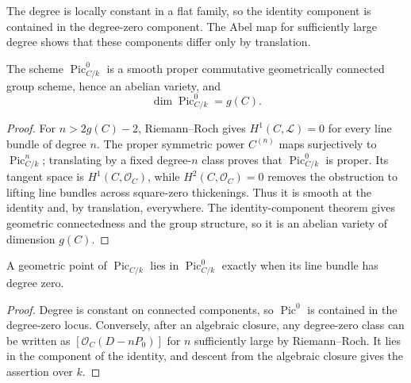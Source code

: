 The degree is locally constant in a flat family, so the identity component is
contained in the degree-zero component.  The Abel map for sufficiently large
degree shows that these components differ only by translation.

\begin{theorem}
  \label{pa-thm-pic0-abelian}
  \cite[Thm.~5.4 and Cors.~5.13--5.14]{kleiman-picard}
  The scheme \(\operatorname{Pic}^0_{C/k}\) is a smooth proper commutative
  geometrically connected group scheme, hence an abelian variety, and
  \[
    \dim\operatorname{Pic}^0_{C/k}=g(C).
  \]
\end{theorem}

\begin{proof}
  For \(n>2g(C)-2\), Riemann--Roch gives \(H^1(C,\mathcal L)=0\) for every
  line bundle of degree \(n\).  The proper symmetric power \(C^{(n)}\) maps
  surjectively to \(\operatorname{Pic}^n_{C/k}\); translating by a fixed
  degree-\(n\) class proves that \(\operatorname{Pic}^0_{C/k}\) is proper.
  Its tangent space is \(H^1(C,\mathcal O_C)\), while
  \(H^2(C,\mathcal O_C)=0\) removes the obstruction to lifting line bundles
  across square-zero thickenings.  Thus it is smooth at the identity and,
  by translation, everywhere.  The identity-component theorem gives
  geometric connectedness and the group structure, so it is an abelian
  variety of dimension \(g(C)\).
\end{proof}

\begin{proposition}
  \label{pa-prop-pic0-degree}
  \cite{kleiman-picard}
  A geometric point of \(\operatorname{Pic}_{C/k}\) lies in
  \(\operatorname{Pic}^0_{C/k}\) exactly when its line bundle has degree zero.
\end{proposition}

\begin{proof}
  Degree is constant on connected components, so \(\operatorname{Pic}^0\) is
  contained in the degree-zero locus.  Conversely, after an algebraic
  closure, any degree-zero class can be written as
  \([\mathcal O_C(D-nP_0)]\) for \(n\) sufficiently large by
  Riemann--Roch.  It lies in the component of the identity, and descent from
  the algebraic closure gives the assertion over \(k\).
\end{proof}
